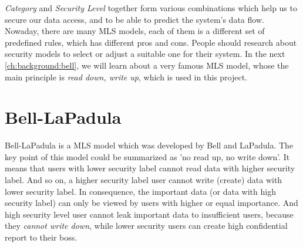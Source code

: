 \emph{Category} and \emph{Security Level} together form various combinations which help us to secure our data access, and to be able to predict the system's data flow.
Nowaday, there are many MLS models, each of them is a different set of predefined rules, which has different pros and cons.
People should research about security models to select or adjust a suitable one for their system. In the next \autoref{ch:background:bell}, we will learn about a very famous MLS model, whose the main principle is \emph{read down, write up}, which is used in this project.


\section{Bell-LaPadula}
\label{ch:background:bell}

Bell-LaPadula is a MLS model which was developed by Bell and LaPadula.
The key point of this model could be summarized as 'no read up, no write down'.
It means that users with lower security label cannot read data with higher security label.
And so on, a higher security label user cannot write (create) data with lower security label.
In consequence, the important data (or data with high security label) can only be viewed by users with higher or equal importance.
And high security level user cannot leak important data to insufficient users, because they \emph{cannot write down}, while lower security users can create high confidential report to their boss.



